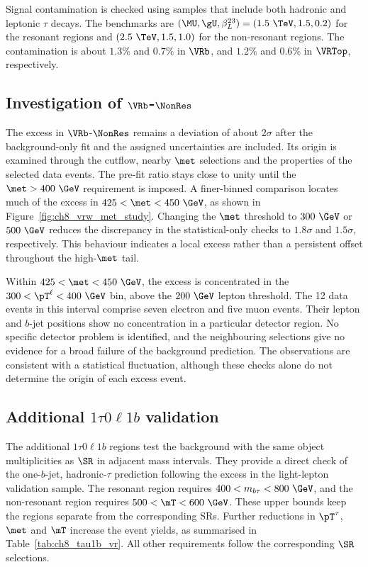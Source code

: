 Signal contamination is checked using samples that include both hadronic and leptonic $\tau$ decays.
The benchmarks are $(\MU,\gU,\beta_L^{23})=(1.5~\TeV,1.5,0.2)$ for the resonant regions and $(2.5~\TeV,1.5,1.0)$ for the non-resonant regions.
The contamination is about $1.3\%$ and $0.7\%$ in $\VRb$, and $1.2\%$ and $0.6\%$ in $\VRTop$, respectively.


\clearpage
\subsection[Investigation of VRW-NonRes]{Investigation of $\VRb$-$\NonRes$}
\label{subsec:ch8_vrw_excess}

The excess in $\VRb$-$\NonRes$ remains a deviation of about $2\sigma$ after the background-only fit and the assigned uncertainties are included.
Its origin is examined through the cutflow, nearby $\met$ selections and the properties of the selected data events.
The pre-fit ratio stays close to unity until the $\met>400~\GeV$ requirement is imposed.
A finer-binned comparison locates much of the excess in $425<\met<450~\GeV$, as shown in Figure~\ref{fig:ch8_vrw_met_study}.
Changing the $\met$ threshold to $300~\GeV$ or $500~\GeV$ reduces the discrepancy in the statistical-only checks to $1.8\sigma$ and $1.5\sigma$, respectively.
This behaviour indicates a local excess rather than a persistent offset throughout the high-$\met$ tail.

Within $425<\met<450~\GeV$, the excess is concentrated in the $300<\pT^\ell<400~\GeV$ bin, above the $200~\GeV$ lepton threshold.
The 12 data events in this interval comprise seven electron and five muon events.
Their lepton and $b$-jet positions show no concentration in a particular detector region.
No specific detector problem is identified, and the neighbouring selections give no evidence for a broad failure of the background prediction.
The observations are consistent with a statistical fluctuation, although these checks alone do not determine the origin of each excess event.


\clearpage
\subsection[Additional 1tau0l1b validation]{Additional $1\tau0\ell1b$ validation}
\label{subsec:ch8_tau1b_vr}

The additional $1\tau0\ell1b$ regions test the background with the same object multiplicities as $\SR$ in adjacent mass intervals.
They provide a direct check of the one-$b$-jet, hadronic-$\tau$ prediction following the excess in the light-lepton validation sample.
The resonant region requires $400<m_{b\tau}<800~\GeV$, and the non-resonant region requires $500<\mT<600~\GeV$.
These upper bounds keep the regions separate from the corresponding SRs.
Further reductions in $\pT^\tau$, $\met$ and $\mT$ increase the event yields, as summarised in Table~\ref{tab:ch8_tau1b_vr}.
All other requirements follow the corresponding $\SR$ selections.

